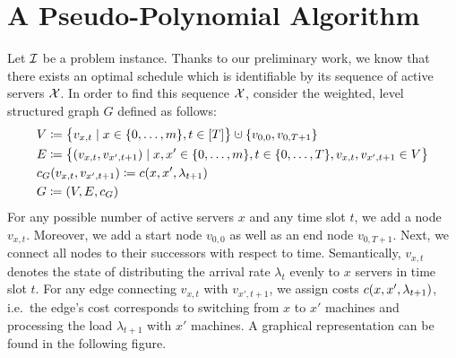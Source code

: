 \section{A Pseudo-Polynomial Algorithm}\label{sec:opt_offline_pseudo_poly}
Let $\mathcal{I}$ be a problem instance. Thanks to our preliminary work, we know that there exists an optimal schedule which is identifiable by its sequence of active servers $\mathcal{X}$. In order to find this sequence $\mathcal{X}$, consider the weighted, level structured graph $G$ defined as follows:
\begin{align*}
	&V\coloneqq\bigl\{v_{x,t}\mid x\in\fromto{0}{m},t\in[T]\bigr\}\dotcup\{v_{0,0},v_{0,T+1}\}\\
	&E\coloneqq\bigl\{(v_{x,t},v_{x',t+1})\mid x,x'\in\fromto{0}{m},t\in\fromto{0}{T},v_{x,t},v_{x',t+1}\in V\bigr\}\\
	&c_G(v_{x,t},v_{x',t+1})\coloneqq\costs(x,x',\lambda_{t+1})\\
	&G\coloneqq(V,E,c_G)
\end{align*}
For any possible number of active servers $x$ and any time slot $t$, we add a node $v_{x,t}$. Moreover, we add a start node $v_{0,0}$ as well as an end node $v_{0,T+1}$. Next, we connect all nodes to their successors with respect to time. Semantically, $v_{x,t}$ denotes the state of distributing the arrival rate $\lambda_{t}$ evenly to $x$ servers in time slot $t$. For any edge connecting $v_{x,t}$ with $v_{x',t+1}$, we assign costs $c(x,x',\lambda_{t+1})$, i.e.\ the edge's cost corresponds to switching from $x$ to $x'$ machines and processing the load $\lambda_{t+1}$ with $x'$ machines. A graphical representation can be found in the following figure.
